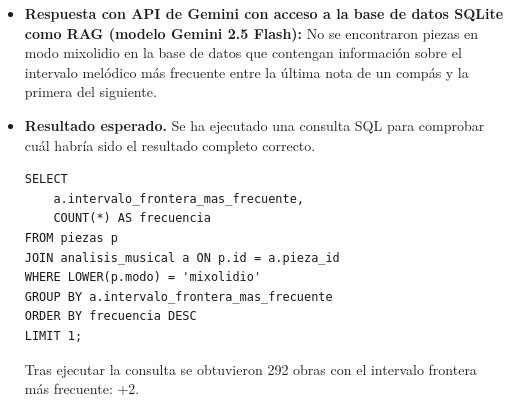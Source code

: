 \begin{itemize}
Sin embargo, sin más información sobre las piezas musicales en cuestión, es difícil determinar cuál de estos o cuales otros intervalos melódicos son los más frecuentes."
    \item \textbf{Respuesta con API de Gemini con acceso a la base de datos SQLite como RAG (modelo Gemini 2.5 Flash):} No se encontraron piezas en modo mixolidio en la base de datos que contengan información sobre el intervalo melódico más frecuente entre la última nota de un compás y la primera del siguiente.
    \item \textbf{Resultado esperado.} Se ha ejecutado una consulta SQL para comprobar cuál habría sido el resultado completo correcto.
    \begin{verbatim}
SELECT 
    a.intervalo_frontera_mas_frecuente,
    COUNT(*) AS frecuencia
FROM piezas p
JOIN analisis_musical a ON p.id = a.pieza_id
WHERE LOWER(p.modo) = 'mixolidio'
GROUP BY a.intervalo_frontera_mas_frecuente
ORDER BY frecuencia DESC
LIMIT 1;
    \end{verbatim}    
    Tras ejecutar la consulta se obtuvieron 292 obras con el intervalo frontera más frecuente: +2.

\end{itemize}

